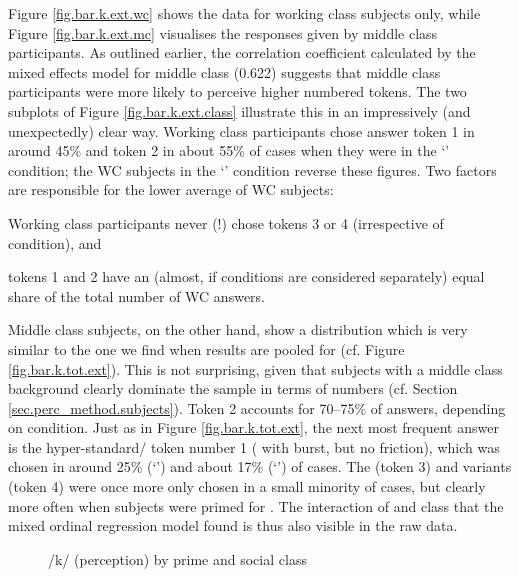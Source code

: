 Figure \ref{fig.bar.k.ext.wc} shows the data for working class subjects only, while Figure \ref{fig.bar.k.ext.mc} visualises the responses given by middle class participants.
As outlined earlier, the correlation coefficient calculated by the mixed effects model for middle class (0.622) suggests that middle class participants were more likely to perceive higher numbered tokens.
The two subplots of Figure \ref{fig.bar.k.ext.class} illustrate this in an impressively (and unexpectedly) clear way.
Working class participants chose answer token 1 in around 45\% and token 2 in about 55\% of cases when they were in the `' condition; the WC subjects in the `' condition reverse these figures.
Two factors are responsible for the lower average of WC subjects:
\begin{inparaenum}[(a)]
	\item Working class participants never (!) chose tokens 3 or 4 (irrespective of  condition), and
	\item tokens 1 and 2 have an (almost, if conditions are considered separately) equal share of the total number of WC answers.
\end{inparaenum} 

Middle class subjects, on the other hand, show a distribution which is very similar to the one we find when results are pooled for  (cf. Figure \ref{fig.bar.k.tot.ext}).
This is not surprising, given that subjects with a middle class background clearly dominate the sample in terms of numbers (cf. Section \ref{sec.perc_method.subjects}).
Token 2 accounts for 70--75\% of answers, depending on  condition.
Just as in Figure \ref{fig.bar.k.tot.ext}, the next most frequent answer is the hyper-standard/ token number 1 ( with burst, but no friction), which was chosen in around 25\% (`') and about 17\% (`') of cases.
The  (token 3) and  variants (token 4) were once more only chosen in a small minority of cases, but clearly more often when subjects were primed for .
The interaction of  and class that the mixed ordinal regression model found is thus also visible in the raw data.

\begin{figure}[h]
	\centering
		\resizebox{.49\linewidth}{!}{} 
	\caption{/k/ (perception) by prime and social class}
	\label{fig.scatter.k.ext.classprime}
\end{figure}

